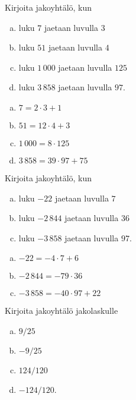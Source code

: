 \begin{tehtavasivu}
\begin{tehtava}
    Kirjoita jakoyhtälö, kun
    \begin{enumerate}[a)]
    \item luku $7$ jaetaan luvulla $3$
    \item luku $51$ jaetaan luvulla $4$
    \item luku $1\,000$ jaetaan luvulla $125$
    \item luku $3\,858$ jaetaan luvulla $97$.
    \end{enumerate}
    
    \begin{vastaus}
        \begin{enumerate}[a)]
        \item $7 = 2\cdot 3 + 1$
        \item $51 = 12\cdot 4 + 3$
        \item $1\,000 = 8 \cdot 125$
        \item $3\,858 = 39\cdot 97 + 75$
        \end{enumerate}
    \end{vastaus}
\end{tehtava}

\begin{tehtava}
    Kirjoita jakoyhtälö, kun
    \begin{enumerate}[a)]
    \item luku $-22$ jaetaan luvulla $7$
    \item luku $-2\,844$ jaetaan luvulla $36$
    \item luku $-3\,858$ jaetaan luvulla $97$.
    \end{enumerate}
    
    \begin{vastaus}
        \begin{enumerate}[a)]
        \item $-22 = -4\cdot 7 + 6$
        \item $-2\,844 = -79\cdot 36$
        \item $-3\,858 = -40\cdot 97 + 22$
        \end{enumerate}
    \end{vastaus}
\end{tehtava}

\begin{tehtava}
    Kirjoita jakoyhtälö jakolaskulle
    \begin{enumerate}[a)]
    \item $9/25$
    \item $-9/25$
    \item $124/120$
    \item $-124/120$.
    \end{enumerate}
    

\end{tehtava}
\end{tehtavasivu}
